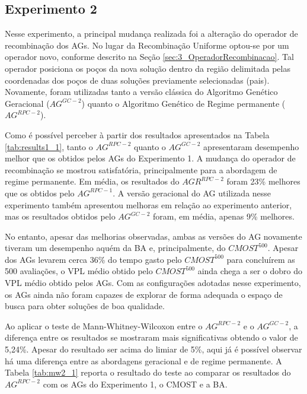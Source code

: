 \subsection{Experimento 2}
\label{ch:5_Experimento2}
Nesse experimento, a principal mudança realizada foi a alteração do operador de recombinação dos AGs. No lugar da Recombinação Uniforme optou-se por um operador novo, conforme descrito na Seção \ref{sec:3_OperadorRecombinacao}. Tal operador posiciona os poços da nova solução dentro da região delimitada pelas coordenadas dos poços de duas soluções previamente selecionadas (pais). Novamente, foram utilizadas tanto a versão clássica do Algoritmo Genético Geracional ($AG^{GC-2}$) quanto o Algoritmo Genético de Regime permanente ($AG^{RPC-2}$).

Como é possível perceber à partir dos resultados apresentados na Tabela \ref{tab:results1_1}, tanto o $AG^{RPC-2}$ quanto o $AG^{GC-2}$ apresentaram desempenho melhor que os obtidos pelos AGs do Experimento 1. A mudança do operador de recombinação se mostrou satisfatória, principalmente para a abordagem de regime permanente. Em média, os resultados do $AGR^{RPC-2}$ foram 23\% melhores que os obtidos pelo $AG^{RPC-1}$. A versão geracional do AG utilizada nesse experimento também apresentou melhoras em relação ao experimento anterior, mas os resultados obtidos pelo $AG^{GC-2}$ foram, em média, apenas 9\% melhores.

No entanto, apesar das melhorias observadas, ambas as versões do AG novamente tiveram um desempenho aquém da BA e, principalmente, do $CMOST^{500}$. Apesar dos AGs levarem cerca 36\% do tempo gasto pelo $CMOST^{500}$ para concluírem as 500 avaliações, o VPL médio obtido pelo $CMOST^{500}$ ainda chega a ser o dobro do VPL médio obtido pelos AGs. Com as configurações adotadas nesse experimento, os AGs ainda não foram capazes de explorar de forma adequada o espaço de busca para obter soluções de boa qualidade. 

Ao aplicar o teste de Mann-Whitney-Wilcoxon entre o $AG^{RPC-2}$ e o $AG^{GC-2}$, a diferença entre os resultados se mostraram mais significativas obtendo o valor de 5,24\%. Apesar do resultado ser acima do limiar de 5\%, aqui já é possível observar há uma diferença entre as abordagens geracional e de regime permanente. A Tabela \ref{tab:mw2_1} reporta o resultado do teste ao comparar os resultados do $AG^{RPC-2}$ com os AGs do Experimento 1, o CMOST e a BA. 

